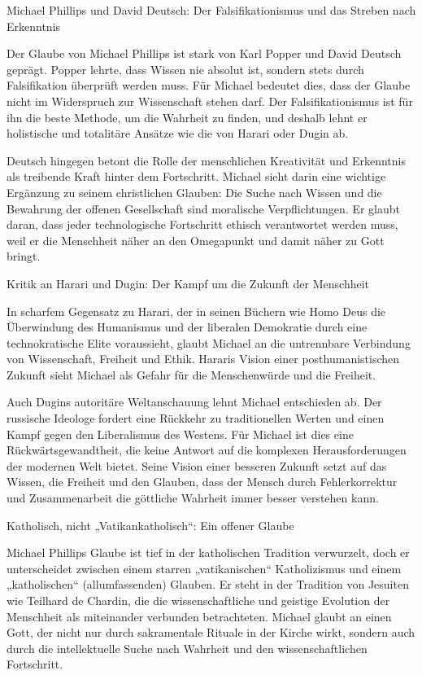 \documentclass[
]{article}
\begin{document}
Michael Phillips und David Deutsch: Der Falsifikationismus und das
Streben nach Erkenntnis

Der Glaube von Michael Phillips ist stark von Karl Popper und David
Deutsch geprägt. Popper lehrte, dass Wissen nie absolut ist, sondern
stets durch Falsifikation überprüft werden muss. Für Michael bedeutet
dies, dass der Glaube nicht im Widerspruch zur Wissenschaft stehen darf.
Der Falsifikationismus ist für ihn die beste Methode, um die Wahrheit zu
finden, und deshalb lehnt er holistische und totalitäre Ansätze wie die
von Harari oder Dugin ab.

Deutsch hingegen betont die Rolle der menschlichen Kreativität und
Erkenntnis als treibende Kraft hinter dem Fortschritt. Michael sieht
darin eine wichtige Ergänzung zu seinem christlichen Glauben: Die Suche
nach Wissen und die Bewahrung der offenen Gesellschaft sind moralische
Verpflichtungen. Er glaubt daran, dass jeder technologische Fortschritt
ethisch verantwortet werden muss, weil er die Menschheit näher an den
Omegapunkt und damit näher zu Gott bringt.

Kritik an Harari und Dugin: Der Kampf um die Zukunft der Menschheit

In scharfem Gegensatz zu Harari, der in seinen Büchern wie Homo Deus die
Überwindung des Humanismus und der liberalen Demokratie durch eine
technokratische Elite voraussieht, glaubt Michael an die untrennbare
Verbindung von Wissenschaft, Freiheit und Ethik. Hararis Vision einer
posthumanistischen Zukunft sieht Michael als Gefahr für die
Menschenwürde und die Freiheit.

Auch Dugins autoritäre Weltanschauung lehnt Michael entschieden ab. Der
russische Ideologe fordert eine Rückkehr zu traditionellen Werten und
einen Kampf gegen den Liberalismus des Westens. Für Michael ist dies
eine Rückwärtsgewandtheit, die keine Antwort auf die komplexen
Herausforderungen der modernen Welt bietet. Seine Vision einer besseren
Zukunft setzt auf das Wissen, die Freiheit und den Glauben, dass der
Mensch durch Fehlerkorrektur und Zusammenarbeit die göttliche Wahrheit
immer besser verstehen kann.

Katholisch, nicht „Vatikankatholisch``: Ein offener Glaube

Michael Phillips\textquotesingle{} Glaube ist tief in der katholischen
Tradition verwurzelt, doch er unterscheidet zwischen einem starren
„vatikanischen`` Katholizismus und einem „katholischen``
(allumfassenden) Glauben. Er steht in der Tradition von Jesuiten wie
Teilhard de Chardin, die die wissenschaftliche und geistige Evolution
der Menschheit als miteinander verbunden betrachteten. Michael glaubt an
einen Gott, der nicht nur durch sakramentale Rituale in der Kirche
wirkt, sondern auch durch die intellektuelle Suche nach Wahrheit und den
wissenschaftlichen Fortschritt.
\end{document}
